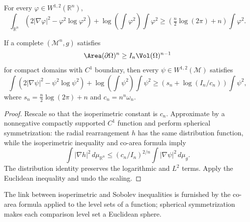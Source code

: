 \begin{theorem}
\label{thm:chow-iii-euclidean-log-sobolev}
For every \(\varphi\in W^{1,2}(\mathbb R^n)\),
\[
 \int_{\mathbb R^n}(2|\nabla\varphi|^2-\varphi^2\log\varphi^2)
 +\log\!\left(\int\varphi^2\right)\int\varphi^2
 \ge\left(\tfrac n2\log(2\pi)+n\right)\int\varphi^2.
\]
\end{theorem}

\begin{theorem}
\label{thm:chow-iii-log-sobolev-isoperimetric}
If a complete \((\mathcal M^n,g)\) satisfies
\[
 \Area(\partial\Omega)^n\ge I_n\Vol(\Omega)^{n-1}
\]
for compact domains with \(C^1\) boundary, then every \(\psi\in W^{1,2}(\mathcal M)\)
satisfies
\[
 \int(2|\nabla\psi|^2-\psi^2\log\psi^2)
 +\log\!\left(\int\psi^2\right)\int\psi^2
 \ge\left(s_n+\log(I_n/c_n)\right)\int\psi^2,
\]
where \(s_n=\frac n2\log(2\pi)+n\) and \(c_n=n^n\omega_n\).
\end{theorem}
\begin{proof}
\sketch Rescale so that the isoperimetric constant is \(c_n\).  Approximate by a
nonnegative compactly supported \(C^1\) function and perform spherical
symmetrization: the radial rearrangement \(h\) has the same distribution
function, while the isoperimetric inequality and co-area formula imply
\[
 \int|\nabla h|^2\,d\mu_{\mathbb R^n}
 \le(c_n/I_n)^{2/n}\int|\nabla\psi|^2\,d\mu_g.
\]
The distribution identity preserves the logarithmic and \(L^2\) terms.  Apply
the Euclidean inequality and undo the scaling.
\end{proof}

\begin{remark}
\label{rem:chow-iii-log-sobolev-coarea}
The link between isoperimetric and Sobolev inequalities is furnished by the
co-area formula applied to the level sets of a function; spherical
symmetrization makes each comparison level set a Euclidean sphere.
\end{remark}

